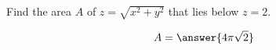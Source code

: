 \documentclass{ximera}
\author{David Guichard \and Neal Koblitz \and H. Jerome Keisler \and Albert Scheller \and Barry Balof \and Mike Wills \and Matthew Carr}
\begin{document}
\begin{exercise}




Find the area $A$ of $z=\sqrt{x^2+y^2}$ that lies below $z=2$.
 
\begin{prompt}
\[
A=\answer{4\pi\sqrt{2}}
\]
\end{prompt}


\end{exercise}
\end{document}
